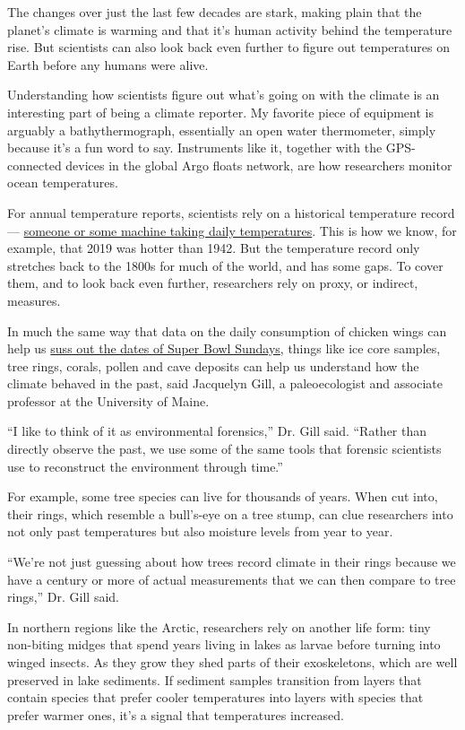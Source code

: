 The changes over just the last few decades are stark, making plain that
the planet's climate is warming and that it's human activity behind the
temperature rise. But scientists can also look back even further to
figure out temperatures on Earth before any humans were alive.

Understanding how scientists figure out what's going on with the climate
is an interesting part of being a climate reporter. My favorite piece of
equipment is arguably a bathythermograph, essentially an open water
thermometer, simply because it's a fun word to say. Instruments like it,
together with the GPS-connected devices in the global Argo floats
network, are how researchers monitor ocean temperatures.

For annual temperature reports, scientists rely on a historical
temperature record ---
\href{https://www.nytimes3xbfgragh.onion/2018/05/09/climate/white-roofs.html}{someone
or some machine taking daily temperatures}. This is how we know, for
example, that 2019 was hotter than 1942. But the temperature record only
stretches back to the 1800s for much of the world, and has some gaps. To
cover them, and to look back even further, researchers rely on proxy, or
indirect, measures.

In much the same way that data on the daily consumption of chicken wings
can help us
\href{https://www.nationalchickencouncil.org/americans-to-eat-more-than-1-3-billion-chicken-wings-for-super-bowl/}{suss
out the dates of Super Bowl Sundays}, things like ice core samples, tree
rings, corals, pollen and cave deposits can help us understand how the
climate behaved in the past, said Jacquelyn Gill, a paleoecologist and
associate professor at the University of Maine.

``I like to think of it as environmental forensics,'' Dr. Gill said.
``Rather than directly observe the past, we use some of the same tools
that forensic scientists use to reconstruct the environment through
time.''

For example, some tree species can live for thousands of years. When cut
into, their rings, which resemble a bull's-eye on a tree stump, can clue
researchers into not only past temperatures but also moisture levels
from year to year.

``We're not just guessing about how trees record climate in their rings
because we have a century or more of actual measurements that we can
then compare to tree rings,'' Dr. Gill said.

In northern regions like the Arctic, researchers rely on another life
form: tiny non-biting midges that spend years living in lakes as larvae
before turning into winged insects. As they grow they shed parts of
their exoskeletons, which are well preserved in lake sediments. If
sediment samples transition from layers that contain species that prefer
cooler temperatures into layers with species that prefer warmer ones,
it's a signal that temperatures increased.

